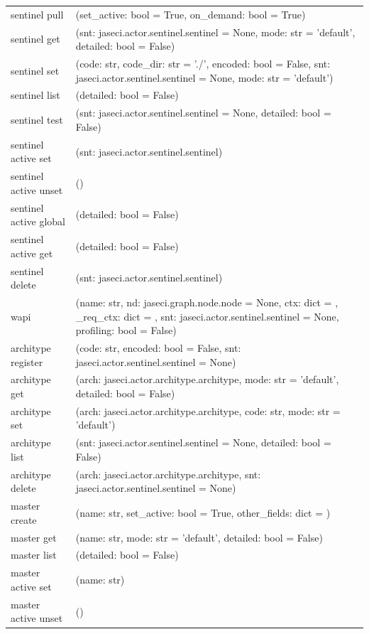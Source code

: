 {\begin{longtable}{l p{10cm}}
        sentinel pull & (set\_active: bool = True, on\_demand: bool = True) \\
        sentinel get & (snt: jaseci.actor.sentinel.sentinel = None, mode: str = 'default', detailed: bool = False) \\
        sentinel set & (code: str, code\_dir: str = './', encoded: bool = False, snt: jaseci.actor.sentinel.sentinel = None, mode: str = 'default') \\
        sentinel list & (detailed: bool = False) \\
        sentinel test & (snt: jaseci.actor.sentinel.sentinel = None, detailed: bool = False) \\
        sentinel active set & (snt: jaseci.actor.sentinel.sentinel) \\
        sentinel active unset & () \\
        sentinel active global & (detailed: bool = False) \\
        sentinel active get & (detailed: bool = False) \\
        sentinel delete & (snt: jaseci.actor.sentinel.sentinel) \\
        wapi & (name: str, nd: jaseci.graph.node.node = None, ctx: dict = {}, \_req\_ctx: dict = {}, snt: jaseci.actor.sentinel.sentinel = None, profiling: bool = False) \\
        architype register & (code: str, encoded: bool = False, snt: jaseci.actor.sentinel.sentinel = None) \\
        architype get & (arch: jaseci.actor.architype.architype, mode: str = 'default', detailed: bool = False) \\
        architype set & (arch: jaseci.actor.architype.architype, code: str, mode: str = 'default') \\
        architype list & (snt: jaseci.actor.sentinel.sentinel = None, detailed: bool = False) \\
        architype delete & (arch: jaseci.actor.architype.architype, snt: jaseci.actor.sentinel.sentinel = None) \\
        master create & (name: str, set\_active: bool = True, other\_fields: dict = {}) \\
        master get & (name: str, mode: str = 'default', detailed: bool = False) \\
        master list & (detailed: bool = False) \\
        master active set & (name: str) \\
        master active unset & () \\

\end{longtable}}
